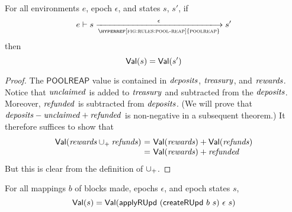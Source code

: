 \begin{lemma}
  \label{lemma:poolreap-pres-of-value}
  For all environments $e$, epoch $\epsilon$, and states $s$, $s'$, if
  \begin{equation*}
    e\vdash s\trans{\hyperref[fig:rules:pool-reap]{poolreap}}{\epsilon}s'
  \end{equation*}
  then
  \begin{equation*}
    \mathsf{Val}(s) = \mathsf{Val}(s')
  \end{equation*}
\end{lemma}

\begin{proof}
  The $\mathsf{POOLREAP}$ value is contained in
  $\mathit{deposits}$, $\mathit{treasury}$, and $\mathit{rewards}$.
  Notice that $\mathit{unclaimed}$ is added to $\mathit{treasury}$
  and subtracted from the $\mathit{deposits}$.
  Moreover, $\mathit{refunded}$ is subtracted from $\mathit{deposits}$.
  (We will prove that $\mathit{deposits}-\mathit{unclaimed}+\mathit{refunded}$
  is non-negative in a subsequent theorem.)
  It therefore suffices to show that
  \begin{equation*}
    \begin{array}{r@{~=~}l}
    \Val(\var{rewards}\unionoverridePlus\var{refunds})
    & \Val(\var{rewards}) + \Val(\var{refunds})
    \\
    & \Val(\var{rewards}) + \var{refunded}
    \end{array}
  \end{equation*}
  But this is clear from the definition of $\mathbin{\cup_{+}}$.
\end{proof}

\begin{lemma}
  \label{lemma:ru-pres-of-value}
  For all mappings $b$ of blocks made, epochs $\epsilon$, and epoch states $s$,
  \begin{equation*}
    \mathsf{Val}(s) = \mathsf{Val}(\mathsf{applyRUpd}~(\mathsf{createRUpd}~b~s)~\epsilon~s)
  \end{equation*}
\end{lemma}

